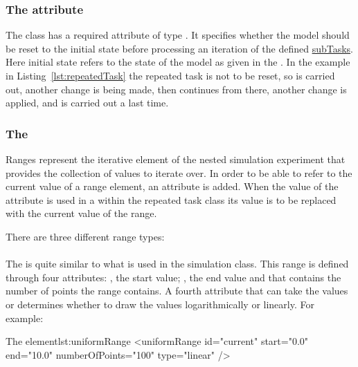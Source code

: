 \subsubsection{The  attribute}
\label{sec:resetModel}
The  class has a required attribute  of type . It specifies whether the model should be reset to the initial state before processing an iteration of the defined \hyperref[class:subTasks]{subTasks}. Here initial state refers to the state of the model as given in the .  In the example in  Listing~\ref{lst:repeatedTask} the repeated task is not to be reset, so  is carried out, another change is being made, then  continues from there, another change is applied, and  is carried out a last time.

\subsubsection{The }
\label{class:ranges}
Ranges represent the iterative element of the nested simulation experiment that provides the collection of values to iterate over. In order to be able to refer to the current value of a range element, an  attribute is added. When the value of the  attribute is used in a  within the repeated task class its value is to be replaced with the current value of the range.

There are three different range types: 

\paragraph{}
\label{class:uniformRange}
The  is quite similar to what is used in the  simulation class. This range is defined through four attributes: , the start value; , the end value and  that contains the number of points the range contains. A fourth attribute  that can take the values  or  determines whether to draw the values logarithmically or linearly.  For example:
\begin{myXmlLst}{The  element}{lst:uniformRange}
    <uniformRange id="current" start="0.0" end="10.0" numberOfPoints="100" type="linear" /> 
\end{myXmlLst}


